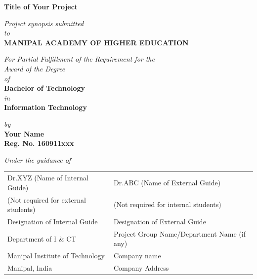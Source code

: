 \documentclass[a4paper,12pt]{article}
\begin{document}
\begin{titlepage}
\vspace*{2cm}
	\begin{center}
	\large{\textbf{Title of Your Project}}
	\end{center}
	\vspace{0.5cm}
	\begin{center}
	\small{\textit{Project synopsis submitted} \\ \vspace{0.25cm} \textit{to} \\ \vspace{0.25cm}\textbf{MANIPAL ACADEMY OF HIGHER EDUCATION} \\}
	\end{center}
	\vspace{0.25cm}
	\begin{center}
	\small{\textit{For Partial Fulfillment of the Requirement for the\\ \vspace{0.25cm}Award of the Degree\\ \vspace{0.25cm}of}} \\ \vspace{0.25cm}
	\textbf{Bachelor of Technology} \\  \vspace{0.25cm} \textit{in} \\ \textbf{Information Technology}
	\end{center}
	
	\begin{center}
	\small{\textit{by}} \\
	\textbf{Your Name} \\ \textbf{Reg. No. 160911xxx} \\
	\end{center}


\begin{center}
	\small{\textit{Under the guidance of}} \\
\renewcommand{\baselinestretch}{1}
\begin{table}[h]
	\centering
		\begin{tabular}{p{3in} p{3in}}
			Dr.XYZ (Name of Internal Guide) &  Dr.ABC (Name of External Guide)  \\
			(Not required for external students)&(Not required for internal students)\\
			Designation of Internal Guide &    Designation of External Guide \\
			Department of I \& CT  &  Project Group Name/Department Name (if any) \\
			 Manipal Institute of Technology& Company name \\
			Manipal, India &  Company Address 
		\end{tabular}
\end{table}
	\end{center}



\end{titlepage}
\end{document}
